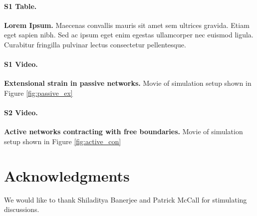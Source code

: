 \documentclass[10pt,letterpaper]{article}
\begin{document}
\paragraph*{S1 Table.}
\label{S1_Table}
{\bf Lorem Ipsum.}  Maecenas convallis mauris sit amet sem ultrices gravida. Etiam eget sapien nibh. Sed ac ipsum eget enim egestas ullamcorper nec euismod ligula. Curabitur fringilla pulvinar lectus consectetur pellentesque.

\paragraph*{S1 Video.}
\label{passive_ex_video}
{\bf Extensional strain in passive networks.}  Movie of simulation setup shown in Figure \ref{fig:passive_ex}

\paragraph*{S2 Video.}
\label{active_con_video}
{\bf Active networks contracting with free boundaries.}  Movie of simulation setup shown in Figure \ref{fig:active_con}

\section*{Acknowledgments}
We would like to thank Shiladitya Banerjee and Patrick McCall for stimulating discussions.

\nolinenumbers

% 


\end{document}
